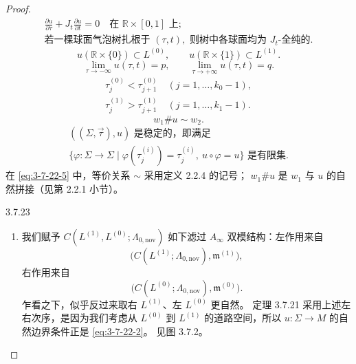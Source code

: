 \begin{proof}
\begin{equation}
\begin{gathered}
 \frac{\partial u}{\partial\tau}
 +J_t\frac{\partial u}{\partial t}=0
 \quad\text{在 }\mathbb R\times[0,1]\text{ 上};\\
 \text{若一棵球面气泡树扎根于 }(\tau,t),
 \text{ 则树中各球面均为 }J_t\text{-全纯的}.
\end{gathered}
\tag{3.7.22.1}\label{eq:3-7-22-1}
\end{equation}
\begin{equation}
 u(\mathbb R\times\{0\})\subset L^{(0)},\qquad
 u(\mathbb R\times\{1\})\subset L^{(1)}.
\tag{3.7.22.2}\label{eq:3-7-22-2}
\end{equation}
\begin{equation}
 \lim_{\tau\to-\infty}u(\tau,t)=p,\qquad
 \lim_{\tau\to+\infty}u(\tau,t)=q.
\tag{3.7.22.3}\label{eq:3-7-22-3}
\end{equation}
\begin{equation}
\begin{gathered}
 \tau_j^{(0)}<\tau_{j+1}^{(0)}
 \quad(j=1,\ldots,k_0-1),\\
 \tau_j^{(1)}>\tau_{j+1}^{(1)}
 \quad(j=1,\ldots,k_1-1).
\end{gathered}
\tag{3.7.22.4}\label{eq:3-7-22-4}
\end{equation}
\begin{equation}
 w_1\#u\sim w_2.
\tag{3.7.22.5}\label{eq:3-7-22-5}
\end{equation}
\begin{equation}
\begin{gathered}
 ((\Sigma,\vec\tau),u)\text{ 是稳定的，即满足}\\
 \bigl\{\varphi\colon\Sigma\to\Sigma\mid
 \varphi(\tau_j^{(i)})=\tau_j^{(i)},\
 u\circ\varphi=u\bigr\}\text{ 是有限集}.
\end{gathered}
\tag{3.7.22.6}\label{eq:3-7-22-6}
\end{equation}
在 \eqref{eq:3-7-22-5} 中，等价关系 $\sim$ 采用定义 2.2.4 的记号；
$w_1\#u$ 是 $w_1$ 与 $u$ 的自然拼接（见第 2.2.1 小节）。

\begin{remark}{3.7.23}\label{rem:3-7-23}
\begin{enumerate}[label=\textup{(\arabic*)},leftmargin=2.8em]
 \item 我们赋予
 $C(L^{(1)},L^{(0)};\Lambda_{0,\mathrm{nov}})$ 如下滤过
 $A_\infty$ 双模结构：左作用来自
 \[
  \bigl(C(L^{(1)};\Lambda_{0,\mathrm{nov}}),\mathfrak m^{(1)}\bigr),
 \]
 右作用来自
 \[
  \bigl(C(L^{(0)};\Lambda_{0,\mathrm{nov}}),\mathfrak m^{(0)}\bigr).
 \]
 乍看之下，似乎反过来取右 $L^{(1)}$、左 $L^{(0)}$ 更自然。
 定理 3.7.21 采用上述左右次序，是因为我们考虑从
 $L^{(0)}$ 到 $L^{(1)}$ 的道路空间，所以
 $u\colon\Sigma\to M$ 的自然边界条件正是 \eqref{eq:3-7-22-2}。
 见图 3.7.2。


\end{enumerate}
\end{remark}
\end{proof}
